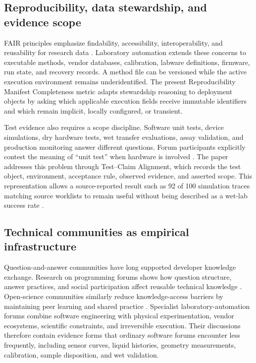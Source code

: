 \subsection{Reproducibility, data stewardship, and evidence scope}

FAIR principles emphasize findability, accessibility, interoperability, and reusability for research data \cite{wilkinson2016fair}. Laboratory automation extends these concerns to executable methods, vendor databases, calibration, labware definitions, firmware, run state, and recovery records. A method file can be versioned while the active execution environment remains underidentified. The present Reproducibility Manifest Completeness metric adapts stewardship reasoning to deployment objects by asking which applicable execution fields receive immutable identifiers and which remain implicit, locally configured, or transient.

Test evidence also requires a scope discipline. Software unit tests, device simulations, dry hardware tests, wet transfer evaluations, assay validation, and production monitoring answer different questions. Forum participants explicitly contest the meaning of ``unit test'' when hardware is involved \cite{forum_unit_tests}. The paper addresses this problem through Test--Claim Alignment, which records the test object, environment, acceptance rule, observed evidence, and asserted scope. This representation allows a source-reported result such as 92 of 100 simulation traces matching source worklists to remain useful without being described as a wet-lab success rate \cite{forum_verisflow}.

\subsection{Technical communities as empirical infrastructure}

Question-and-answer communities have long supported developer knowledge exchange. Research on programming forums shows how question structure, answer practices, and social participation affect reusable technical knowledge \cite{treude2011questions,vasilescu2014social}. Open-science communities similarly reduce knowledge-access barriers by maintaining peer learning and shared practice \cite{eerland2021communities}. Specialist laboratory-automation forums combine software engineering with physical experimentation, vendor ecosystems, scientific constraints, and irreversible execution. Their discussions therefore contain evidence forms that ordinary software forums encounter less frequently, including sensor curves, liquid histories, geometry measurements, calibration, sample disposition, and wet validation.

